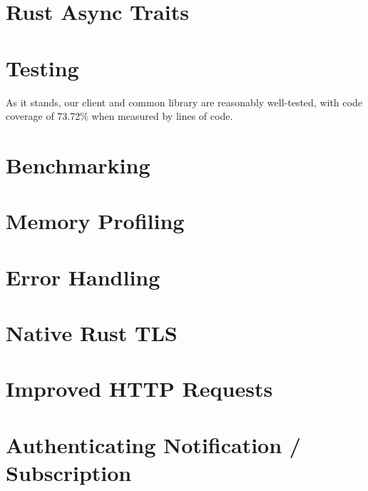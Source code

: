 \section{Rust Async Traits}

\section{Testing}
As it stands, our client and common library are reasonably well-tested, with code coverage of 73.72\% when measured by lines of code.


\section{Benchmarking}

\section{Memory Profiling}

\section{Error Handling}

\section{Native Rust TLS}

\section{Improved HTTP Requests}

\section{Authenticating Notification / Subscription}


